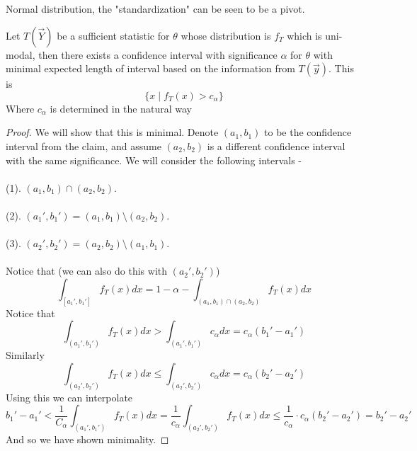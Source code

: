\documentclass[../main.tex]{subfiles}
\begin{document}
\begin{example}
Normal distribution, the "standardization" can be seen to be a pivot. 
\end{example}
\begin{claim}
Let $T(\overrightarrow{Y})$ be a sufficient statistic for $\theta$ whose distribution is $f_{T}$ which is uni-modal, then there exists a confidence interval with significance $\alpha$ for $\theta$ with minimal expected length of interval based on the information from $T(\overrightarrow{y})$. This is 
\[\{x\mid f_T(x)>c_{\alpha}\}\]
Where $c_{\alpha}$ is determined in the natural way
\end{claim}
\begin{proof}
We will show that this is minimal. Denote $(a_1,b_1)$ to be the confidence interval from the claim, and assume $(a_2,b_2)$ is a different confidence interval with the same significance. 
We will consider the following intervals -\\\\ 
(1). $(a_1,b_1)\cap(a_2,b_2)$. \\\\
(2). $(a_1', b_1') = (a_1,b_1)\setminus(a_2,b_2)$. \\\\
(3). $(a_2', b_2') = (a_2,b_2)\setminus(a_1,b_1)$. \\\\
Notice that (we can also do this with $(a_2', b_2')$)
\[\int_{[a_1', b_1']} f_{T}(x) dx = 1-\alpha -\int_{(a_1,b_1)\cap(a_2,b_2)} f_T(x)dx\]
Notice that
\[\int_{(a_1', b_1')} f_T(x) dx >\int_{(a_1', b_1')} c_{\alpha} dx = c_{\alpha}(b_1' - a_1')\]
Similarly
\[\int_{(a_2', b_2')} f_T(x) dx \leq \int_{(a_2', b_2')} c_{\alpha} dx = c_{\alpha}(b_2' - a_2')\]
Using this we can interpolate
\[b_1'-a_1'< \frac{1}{C_{\alpha}} \int_{(a_1', b_1')} f_T(x) dx = \frac{1}{c_{\alpha}} \int_{(a_2', b_2')} f_T(x) dx\leq \frac{1}{c_{\alpha}}\cdot c_{\alpha} (b_2' - a_2') = b_2' - a_2'\]
And so we have shown minimality. 
\end{proof}
\end{document}
